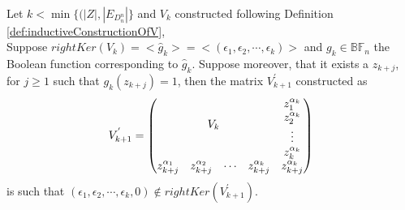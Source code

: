 \documentclass[11pt]{llncs}
\begin{document}
\\
\begin{proposition}\label{prop:swappingElementOfZToReduceKer}
    Let $k < \min\{(|Z|, |E_{D_n^n}|\}$ and $V_k$ constructed following Definition \ref{def:inductiveConstructionOfV},\\
    Suppose $rightKer(V_k) = <\hat{g}_k> = <(\epsilon_1,\epsilon_2, \cdots, \epsilon_k )>$ and $g_k\in \mathbb{BF}_n$ the Boolean function corresponding to $\hat{g}_k$. Suppose moreover, that it exists a $z_{k+j}$, for $j\geq 1$ such that $g_k(z_{k+j}) = 1$, then the matrix $V^{'}_{k+1}$ constructed as
    \begin{align*}
        V^{'}_{k+1} = 
        \begin{pmatrix}
        \multicolumn{4}{c}{\multirow{4}{*}{$V_{k}$}} & z_{1}^{\alpha_k}\\
        & & & & z_{2}^{\alpha_k}\\
        & & & & \vdots\\
        & & & & z_{k}^{\alpha_{k}}\\
        z_{k+j}^{\alpha_{1}} & z_{k+j}^{\alpha_{2}}& \cdots & z_{k+j}^{\alpha_{k}} & z_{k+j}^{\alpha_{k}}
    \end{pmatrix}
    \end{align*}
    is such that $(\epsilon_1, \epsilon_2, \cdots, \epsilon_k, 0) \not\in rightKer(V^{'}_{k+1})$.
\end{proposition}
\end{document}
